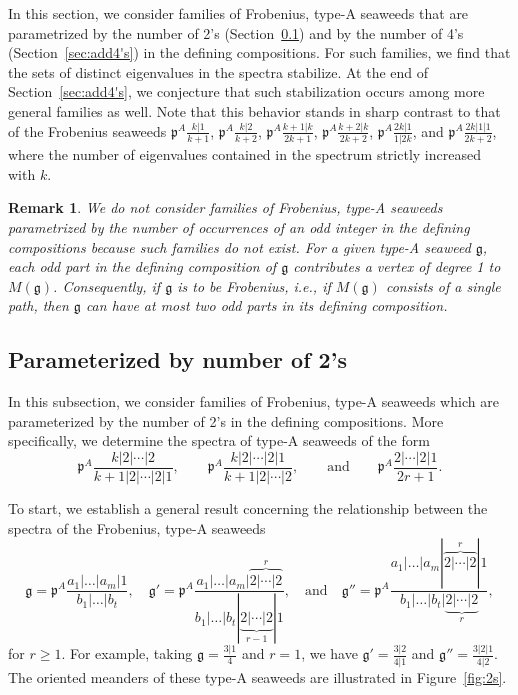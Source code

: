 \documentclass[letterpaper,10pt]{article}
\newtheorem{remark}[theorem]{Remark}
\begin{document}
In this section, we consider families of Frobenius, type-A seaweeds that are parametrized by the number of 2's (Section~\ref{sec:add2's}) and by the number of 4's (Section~\ref{sec:add4's}) in the defining compositions. For such families, we find that the sets of distinct eigenvalues in the spectra stabilize. At the end of Section~\ref{sec:add4's}, we conjecture that such stabilization occurs among more general families as well. Note that this behavior stands in sharp contrast to that of the Frobenius seaweeds $\mathfrak{p}^A\frac{k|1}{k+1}$, $\mathfrak{p}^A\frac{k|2}{k+2}$, $\mathfrak{p}^A\frac{k+1|k}{2k+1}$, $\mathfrak{p}^A\frac{k+2|k}{2k+2}$, $\mathfrak{p}^A\frac{2k|1}{1|2k}$, and $\mathfrak{p}^A\frac{2k|1|1}{2k+2}$, where the number of eigenvalues contained in the spectrum strictly increased with $k$.

\begin{remark}
We do not consider families of Frobenius, type-A seaweeds parametrized by the number of occurrences of an odd integer in the defining compositions because such families do not exist. For a given type-A seaweed $\mathfrak{g}$, each odd part in the defining composition of $\mathfrak{g}$ contributes a vertex of degree 1 to $M(\mathfrak{g})$. Consequently, if $\mathfrak{g}$ is to be Frobenius, i.e., if $M(\mathfrak{g})$ consists of a single path, then $\mathfrak{g}$ can have at most two odd parts in its defining composition.
\end{remark}



\subsection{Parameterized by number of 2's}\label{sec:add2's}

In this subsection, we consider families of Frobenius, type-A seaweeds which are parameterized by the number of 2's in the defining compositions. More specifically, we determine the spectra of type-A seaweeds of the form $$\mathfrak{p}^A\frac{k|2|\cdots|2}{k+1|2|\cdots|2|1},\quad\quad\mathfrak{p}^A\frac{k|2|\cdots|2|1}{k+1|2|\cdots|2},\quad\quad\text{and}\quad\quad \mathfrak{p}^A\frac{2|\cdots|2|1}{2r+1}.$$

To start, we establish a general result concerning the relationship between the spectra of the Frobenius, type-A seaweeds $$\mathfrak{g}=\mathfrak{p}^A\frac{a_1|\hdots|a_m|1}{b_1|\hdots|b_t},\quad \mathfrak{g}'=\mathfrak{p}^A\frac{a_1|\hdots|a_m|\overbrace{2|\cdots|2}^r}{b_1|\hdots|b_t|\underbrace{2|\cdots|2}_{r-1}|1},\quad\text{and}\quad \mathfrak{g}''=\mathfrak{p}^A\frac{a_1|\hdots|a_m|\overbrace{2|\cdots|2}^r|1}{b_1|\hdots|b_t|\underbrace{2|\cdots|2}_{r}},$$ for $r\ge 1$. For example, taking $\mathfrak{g}=\frac{3|1}{4}$ and $r=1$, we have $\mathfrak{g}'=\frac{3|2}{4|1}$ and  $\mathfrak{g}''=\frac{3|2|1}{4|2}$. The oriented meanders of these type-A seaweeds are illustrated in Figure~\ref{fig:2s}.
\end{document}
